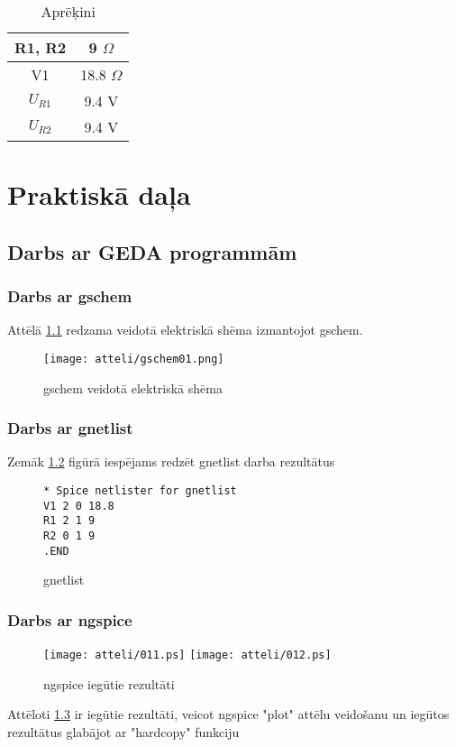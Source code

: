 \documentclass{report}
\begin{document}
\begin{table}[h]
\centering
\caption{Aprēķini}
\label{i:tabula}
\begin{tabular}[h]{|c|c|}
\hline
R1, R2 & 9 $\Omega$ \\
\hline
V1 & 18.8 $\Omega$ \\
\hline
$U_{R1}$ & 9.4 V \\
\hline
$U_{R2}$ & 9.4 V \\
\hline
\end{tabular}
\end{table}

\chapter{Praktiskā daļa}
\section{Darbs ar GEDA programmām}

\subsection{Darbs ar gschem}
Attēlā \ref{i:gschem} redzama veidotā elektriskā shēma izmantojot gschem.

\begin{figure}[!b]
\texttt{[image: atteli/gschem01.png]}
\caption{gschem veidotā elektriskā shēma}
\label{i:gschem}
\end{figure}

\subsection{Darbs ar gnetlist}
Zemāk \ref{i:gnetlist} figūrā iespējams redzēt gnetlist darba rezultātus 
\begin{figure}[h!]
\caption{gnetlist}
\label{i:gnetlist}
\begin{verbatim}
* Spice netlister for gnetlist
V1 2 0 18.8
R1 2 1 9
R2 0 1 9
.END
\end{verbatim}
\end{figure}

\subsection{Darbs ar ngspice}
\begin{figure}[t]
\caption{ngspice iegūtie rezultāti}
\label{i:ngspice}
\texttt{[image: atteli/011.ps]}
\texttt{[image: atteli/012.ps]}
\end{figure}
Attēloti \ref{i:ngspice} ir iegūtie rezultāti, veicot ngspice "plot" attēlu veidošanu un iegūtos rezultātus glabājot ar "hardcopy" funkciju
\end{document}
